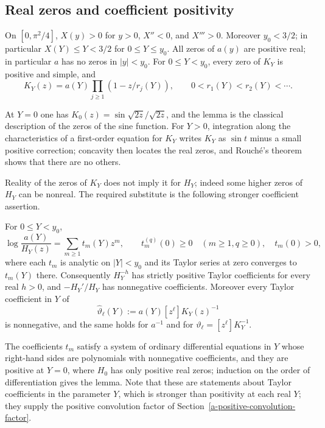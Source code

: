 \subsection{Real zeros and coefficient positivity}\label{real-zeros-of-the-kernel}

\begin{lemma}\label{lem:kernel-zeros}
On \([0,\pi^2/4]\), \(X(y)>0\) for \(y>0\), \(X''<0\), and \(X'''>0\).
Moreover \(y_0<3/2\); in particular \(X(Y)\le Y<3/2\) for
\(0\le Y\le y_0\). All zeros of \(a(y)\) are positive real; in particular
\(a\) has no zeros in \(|y|<y_0\). For \(0\le Y<y_0\), every zero of
\(K_Y\) is positive and simple, and \begin{equation}
K_Y(z)=a(Y)\prod_{j\ge1}(1-z/r_j(Y)),
 \qquad 0<r_1(Y)<r_2(Y)<\cdots.                     \label{eq:P5}
\end{equation}
\end{lemma}

At \(Y=0\) one has \(K_0(z)=\sin\sqrt{2z}/\sqrt{2z}\), and the lemma is
the classical description of the zeros of the sine function. For
\(Y>0\), integration along the characteristics of a first-order
equation for \(K_Y\) writes \(K_Y\) as \(\sin t\) minus a small positive
correction; concavity then locates the real zeros, and Rouch\'e's
theorem shows that there are no others.

Reality of the zeros of \(K_Y\) does not imply it for \(H_Y\); indeed
some higher zeros of \(H_Y\) can be nonreal. The required substitute is
the following stronger coefficient assertion.

\begin{lemma}\label{lem:kernel-positivity}
For \(0\le Y<y_0\), \begin{equation}
\log\frac{a(Y)}{H_Y(z)}=\sum_{m\ge1}t_m(Y)z^m,
 \qquad t_m^{(q)}(0)\ge0\quad(m\ge1,q\ge0),\quad t_m(0)>0, \label{eq:P6}
\end{equation} where each \(t_m\) is analytic on \(|Y|<y_0\) and its Taylor
series at zero converges to \(t_m(Y)\) there. Consequently \(H_Y^{-h}\)
has strictly positive Taylor coefficients for every real \(h>0\), and
\(-H_Y'/H_Y\) has nonnegative coefficients. Moreover every Taylor
coefficient in \(Y\) of \[
 \widehat\vartheta_\ell(Y):=a(Y)[z^\ell]K_Y(z)^{-1}
\] is nonnegative, and the same holds for \(a^{-1}\) and for
\(\vartheta_\ell=[z^\ell]K_Y^{-1}\).
\end{lemma}

The coefficients \(t_m\) satisfy a system of ordinary differential
equations in \(Y\) whose right-hand sides are polynomials with
nonnegative coefficients, and they are positive at \(Y=0\), where \(H_0\)
has only positive real zeros; induction on the order of differentiation
gives the lemma. Note that these are statements about Taylor coefficients
in the parameter \(Y\), which is stronger than positivity at each real
\(Y\); they supply the positive convolution factor of
Section~\ref{a-positive-convolution-factor}.

